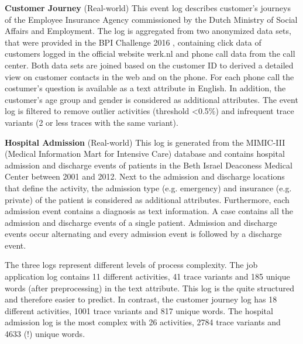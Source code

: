 \textbf{Customer Journey} (Real-world) This event log describes customer's journeys of the Employee Insurance Agency commissioned by the Dutch Ministry of Social Affairs and Employment.
The log is aggregated from two anonymized data sets, that were provided in the BPI Challenge 2016 \cite{bpichallenge2016}, containing click data of customers logged in the official website werk.nl and phone call data from the call center.
Both data sets are joined based on the customer ID to derived a detailed view on customer contacts in the web and on the phone.
For each phone call the costumer's question is available as a text attribute in English.
In addition, the customer's age group and gender is considered as additional attributes.
The event log is filtered to remove outlier activities (threshold <0.5\%) and infrequent trace variants (2 or less traces with the same variant).
 
\textbf{Hospital Admission} (Real-world) This log is generated from the MIMIC-III (Medical Information Mart for Intensive Care) database \cite{johnson2016mimic} and contains hospital admission and discharge events of patients in the Beth Israel Deaconess Medical Center between 2001 and 2012.
Next to the admission and discharge locations that define the activity, the admission type (e.g. emergency) and insurance (e.g. private) of the patient is considered as additional attributes.
Furthermore, each admission event contains a diagnosis as text information.
A case contains all the admission and discharge events of a single patient.
Admission and discharge events occur alternating and every admission event is followed by a discharge event.

The three logs represent different levels of process complexity.
The job application log contains 11 different activities, 41 trace variants and 185 unique words (after preprocessing) in the text attribute.
This log is the quite structured and therefore easier to predict.
In contrast, the customer journey log has 18 different activities, 1001 trace variants and 817 unique words.
The hospital admission log is the most complex with 26 activities, 2784 trace variants and 4633 (!) unique words.


